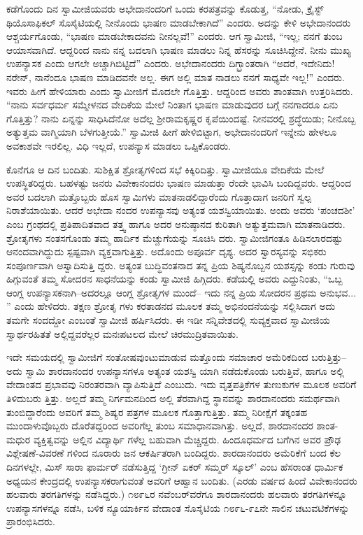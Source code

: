 ಕಡೆಗೊಂದು ದಿನ ಸ್ವಾಮೀಜಿಯವರು ಅಭೇದಾನಂದರಿಗೆ ಒಂದು ಕರಪತ್ರವನ್ನು ಕೊಡುತ್ತ, “ನೋಡು, ಕ್ರೈಸ್ಟ್ ಥಿಯೊಸಾಫಿಕಲ್ ಸೊಸೈಟಿಯಲ್ಲಿ ನೀನೊಂದು ಭಾಷಣ ಮಾಡಬೇಕಾಗಿದೆ” ಎಂದರು. ಅದನ್ನು ಕೇಳಿ ಅಭೇದಾನಂದರು ಆಶ್ಚರ್ಯಗೊಂಡು, “ಭಾಷಣ ಮಾಡಬೇಕಾದವನು ನೀನಲ್ಲವೆ!” ಎಂದರು. ಆಗ ಸ್ವಾಮೀಜಿ, “ಇಲ್ಲ; ನನಗೆ ತುಂಬ ಆಯಾಸವಾಗಿದೆ. ಆದ್ದರಿಂದ ನಾನು ನನ್ನ ಬದಲಾಗಿ ಭಾಷಣ ಮಾಡಲು ನಿನ್ನ ಹೆಸರನ್ನು ಸೂಚಿಸಿದ್ದೇನೆ. ನೀನು ಮುಖ್ಯ ಉಪನ್ಯಾಸಕ ಎಂದು ಆಗಲೇ ಅಚ್ಚಾಗಿಬಿಟ್ಟಿದೆ” ಎಂದರು. ಅಭೇದಾನಂದರು ದಿಗ್ಭ್ರಾಂತರಾಗಿ “ಅದರೆ, ಇದೇನಿದು! ನರೇನ್, ನಾನೆಂದೂ ಭಾಷಣ ಮಾಡಿದವನೇ ಅಲ್ಲ. ಈಗ ಅಲ್ಲಿ ಮಾತ ನಾಡಲು ನನಗೆ ಸಾಧ್ಯವೇ ಇಲ್ಲ!” ಎಂದರು. ಇವರು ಹೀಗೆ ಹೇಳಿಯಾರು ಎಂದು ಸ್ವಾಮೀಜಿಗೆ ಮೊದಲೇ ಗೊತ್ತಿತ್ತು. ಆದ್ದರಿಂದ ಅವರು ಶಾಂತವಾಗಿ ಉತ್ತರಿಸಿದರು. “ನಾನು ಸರ್ವಧರ್ಮ ಸಮ್ಮೇಳನದ ವೇದಿಕೆಯ ಮೇಲೆ ನಿಂತಾಗ ಭಾಷಣ ಮಾಡುವುದರ ಬಗ್ಗೆ ನನಗಾದರೂ ಏನು ಗೊತ್ತಿತ್ತು? ನಾನು ಏನ್ನನ್ನು ಸಾಧಿಸಿದೆನೋ ಅದೆಲ್ಲ ಶ್ರೀರಾಮಕೃಷ್ಣರ ಕೃಪೆಯಿಂದಷ್ಟೆ. ನೀನವರಲ್ಲಿ ಶ್ರದ್ಧೆಯಿಡು; ನೀನೊಬ್ಬ ಅತ್ಯುತ್ತಮ ವಾಗ್ಮಿಯಾಗಿ ಬೆಳಗುತ್ತೀಯೆ.” ಸ್ವಾಮೀಜಿ ಹೀಗೆ ಹೇಳಿಬಿಟ್ಟಾಗ, ಅಭೇದಾನಂದರಿಗೆ ಇನ್ನೇನು ಹೇಳಲೂ ಅವಕಾಶವೇ ಇರಲಿಲ್ಲ. ವಿಧಿ ಇಲ್ಲದೆ, ಉಪನ್ಯಾಸ ಮಾಡಲು ಒಪ್ಪಿಕೊಂಡರು.

ಕೊನೆಗೂ ಆ ದಿನ ಬಂದಿತು. ಸುಶಿಕ್ಷಿತ ಶ್ರೋತೃಗಳಿಂದ ಸಭೆ ಕಿಕ್ಕಿರಿದಿತ್ತು. ಸ್ವಾಮೀಜಿಯೂ ವೇದಿಕೆಯ ಮೇಲೆ ಉಪಸ್ಥಿತರಿದ್ದರು. ಬಹಳಷ್ಟು ಜನರು ವಿವೇಕಾನಂದರು ಭಾಷಣ ಮಾಡುತ್ತಾ ರೆಂದೇ ಭಾವಿಸಿ ಬಂದಿದ್ದವರು. ಆದ್ದರಿಂದ ಅವರ ಬದಲಾಗಿ ಮತ್ತೊಬ್ಬರು ಹೊಸ ಸ್ವಾಮಿಗಳು ಮಾತನಾಡಲಿದ್ದಾರೆಂದು ಗೊತ್ತಾದಾಗ ಜನರಿಗೆ ಸ್ವಲ್ಪ ನಿರಾಶೆಯಾಯಿತು. ಆದರೆ ಅಭೇದಾ ನಂದರ ಉಪನ್ಯಾಸವು ಅತ್ಯಂತ ಯಶಸ್ವಿಯಾಯಿತು. ಅಂದು ಅವರು ‘ಪಂಚದಶೀ’ ಎಂಬ ಗ್ರಂಥದಲ್ಲಿ ಪ್ರತಿಪಾದಿತವಾದ ತತ್ತ್ವ ಹಾಗೂ ಅದರ ಅನುಷ್ಠಾನದ ಕುರಿತಾಗಿ ಅತ್ಯುತ್ತಮವಾಗಿ ಮಾತನಾಡಿದರು. ಶ್ರೋತೃಗಳು ಸಂತಸಗೊಂಡು ತಮ್ಮ ಹಾರ್ದಿಕ ಮೆಚ್ಚುಗೆಯನ್ನು ಸೂಚಿಸಿ ದರು. ಸ್ವಾಮೀಜಿಗಂತೂ ಹಿಡಿಸಲಾರದಷ್ಟು ಆನಂದವಾಗಿದ್ದುದು ಸ್ಪಷ್ಟವಾಗಿ ವ್ಯಕ್ತವಾಗುತ್ತಿತ್ತು. ಅದೊಂದು ಅಪೂರ್ವ ದೃಶ್ಯ. ಅದರ ಸ್ವಾರಸ್ಯವನ್ನು ಸಭಿಕರು ಸಂಪೂರ್ಣವಾಗಿ ಅಸ್ವಾದಿಸುತ್ತಿ ದ್ದರು. ಅತ್ಯಂತ ಬುದ್ಧಿವಂತನಾದ ತನ್ನ ಪ್ರಿಯ ಶಿಷ್ಯನೊಬ್ಬನ ಯಶಸ್ಸನ್ನು ಕಂಡು ಗುರುವು ಹಿಗ್ಗುವಂತೆ ತಮ್ಮ ಸೋದರನ ಸಾಧನೆಯನ್ನು ಕಂಡು ಸ್ವಾಮೀಜಿ ಹಿಗ್ಗಿದರು. ಕಡೆಯಲ್ಲಿ ಅವರು ಎದ್ದುನಿಂತು, “ಒಬ್ಬ ಆಂಗ್ಲ ಉಪನ್ಯಾಸಕನಾಗಿ–ಅದರಲ್ಲೂ ಆಂಗ್ಲ ಶ್ರೋತೃಗಳ ಮುಂದೆ– ಇದು ನನ್ನ ಪ್ರಿಯ ಸೋದರನ ಪ್ರಥಮ ಅನುಭವ... ” ಎಂದು ಹೇಳಿದರು. ತಕ್ಷಣ ಶ್ರೋತೃ ಗಳು ಕರತಾಡನದ ಮೂಲಕ ತಮ್ಮ ಅಭಿನಂದನೆಯನ್ನು ಸಲ್ಲಿಸಿದಾಗ ಅದು ತಮಗೇ ಸಂದದ್ದೋ ಎಂಬಂತೆ ಸ್ವಾಮೀಜಿ ಹರ್ಷಿಸಿದರು. ಈ ಇಡೀ ಸನ್ನಿವೇಶದಲ್ಲಿ ಸುವ್ಯಕ್ತವಾದ ಸ್ವಾಮೀಜಿಯ ಸ್ವಾರ್ಥರಹಿತತೆ ಅಲ್ಲಿದ್ದವರೆಲ್ಲರ ಮನಃಪಟಲದ ಮೇಲೆ ಚಿರಮುದ್ರಿತವಾಯಿತು.

ಇದೇ ಸಮಯದಲ್ಲಿ ಸ್ವಾಮೀಜಿಗೆ ಸಂತೋಷವುಂಟುಮಾಡುವ ಮತ್ತೊಂದು ಸಮಾಚಾರ ಅಮೆರಿಕದಿಂದ ಬರುತ್ತಿತ್ತು–ಅದು ಸ್ವಾಮಿ ಶಾರದಾನಂದರ ಉಪನ್ಯಾಸಗಳೂ ಅತ್ಯಂತ ಯಶಸ್ವಿ ಯಾಗಿ ನಡೆದುಕೊಂಡು ಬರುತ್ತಿವೆ, ಹಾಗೂ ಅಲ್ಲಿ ವೇದಾಂತದ ಪ್ರಭಾವವು ನಿರಂತರವಾಗಿ ವ್ಯಾಪಿಸುತ್ತಿದೆ ಎಂಬುದು. ಇದು ವೃತ್ತಪತ್ರಿಕೆಗಳ ತುಣುಕುಗಳ ಮೂಲಕ ಅವರಿಗೆ ತಿಳಿದುಬರು ತ್ತಿತ್ತು. ಅಲ್ಲದೆ ತಮ್ಮ ನಿರ್ಗಮನದಿಂದ ಅಲ್ಲಿ ತೆರವಾಗಿದ್ದ ಸ್ಥಾನವನ್ನು ಶಾರದಾನಂದರು ಸಮರ್ಥವಾಗಿ ತುಂಬಿದ್ದಾರೆಂದು ಅವರಿಗೆ ತಮ್ಮ ಶಿಷ್ಯರ ಪತ್ರಗಳ ಮೂಲಕ ಗೊತ್ತಾಗುತ್ತಿತ್ತು. ತಮ್ಮ ನಿರೀಕ್ಷೆಗೆ ತಕ್ಕಂತಹ ಮುಂದಾಳುವೊಬ್ಬರು ದೊರೆತದ್ದರಿಂದ ಅವರಿಗೆಲ್ಲ ತುಂಬ ಸಮಾಧಾನವಾಗಿತ್ತು. ಅಲ್ಲದೆ, ಶಾರದಾನಂದರ ಶಾಂತ-ಮಧುರ ವ್ಯಕ್ತಿತ್ವವನ್ನು ಅಲ್ಲಿನ ವಿದ್ಯಾರ್ಥಿ ಗಳೆಲ್ಲ ಬಹುವಾಗಿ ಮೆಚ್ಚಿದ್ದರು. ಹಿಂದೂಧರ್ಮದ ಬಗೆಗಿನ ಅವರ ಪ್ರೌಢ ವಿಶ್ಲೇಷಣೆ-ವಿವರಣೆ ಗಳಿಂದ ನೂರಾರು ಜನ ಆಕರ್ಷಿತರಾಗಿ ಬಂದಿದ್ದರು. ಶಾರದಾನಂದರು ಅಮೆರಿಕೆಗೆ ಬಂದ ಕೆಲ ದಿನಗಳಲ್ಲೇ, ಮಿಸ್ ಸಾರಾ ಫಾರ್ಮರ್ ನಡೆಸುತ್ತಿದ್ದ ‘ಗ್ರೀನ್ ಏಕರ್ ಸಮ್ಮರ್ ಸ್ಕೂಲ್​’ ಎಂಬ ಹೆಸರಾಂತ ಧಾರ್ಮಿಕ ಅಧ್ಯಯನ ಕೇಂದ್ರದಲ್ಲಿ ಉಪನ್ಯಾಸಕರಾಗುವಂತೆ ಅವರಿಗೆ ಆಹ್ವಾನ ಬಂದಿತು. (ಎರಡು ವರ್ಷದ ಹಿಂದೆ ವಿವೇಕಾನಂದರು ಹಲವಾರು ತರಗತಿಗಳನ್ನು ನಡೆಸಿದ್ದರು.) ೧೮೯೬ರ ನವೆಂಬರ್​ವರೆಗೂ ಶಾರದಾನಂದರು ಹಲವಾರು ತರಗತಿಗಳನ್ನೂ ಉಪನ್ಯಾಸಗಳನ್ನೂ ನಡೆಸಿ, ಬಳಿಕ ನ್ಯೂಯಾರ್ಕಿನ ವೇದಾಂತ ಸೊಸೈಟಿಯ ೧೮೯೬-೯೭ನೇ ಸಾಲಿನ ಚಟುವಟಿಕೆಗಳನ್ನು ಪ್ರಾರಂಭಿಸಿದರು.


